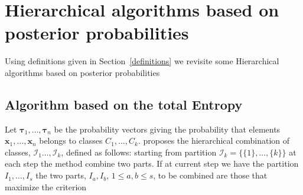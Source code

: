 \documentclass[10pt, a4paper]{article}
\begin{document}


\section{Hierarchical algorithms based on posterior probabilities}

Using definitions given in Section~\ref{definitions} we revisite some Hierarchical algorithms based on posterior probabilities

\subsection*{Algorithm based on the total Entropy}

Let ${\boldsymbol\tau}_1, \dots, {\boldsymbol\tau}_n$ be the probability vectors giving the probability that elements $\textbf{x}_1, \dots, \textbf{x}_n$ belongs to classes $C_1, \dots, C_k$.  \cite{baudry2010combining} proposes the  hierarchical combination of classes,  $\mathcal{I}_1 \dots, \mathcal{I}_k$, defined as follows: starting from partition $\mathcal{I}_k = \{\{1\},\dots, \{k\}\}$ at each step the method combine two parts. If at current step we have the partition  $I_1, \dots, I_s$ the two parts, $I_a, I_b$, $1 \leq a,b \leq s$, to be combined are those that maximize the criterion
\end{document}
